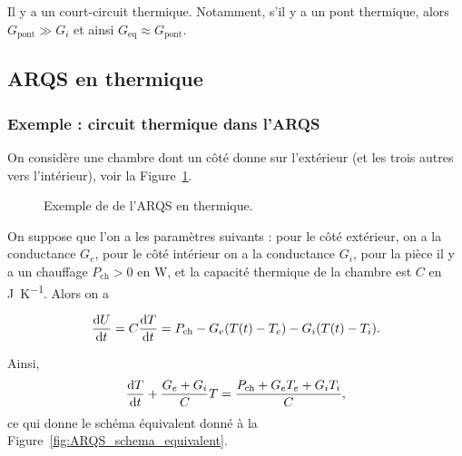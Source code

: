         Il y a un \og court-circuit thermique\fg. Notamment, s'il y a un pont thermique, alors $G_{\text{pont}}\gg G_i$ et ainsi $G_{\text{eq}}\approx G_{\text{pont}}$.

    \subsection{ARQS en thermique}

        \subsubsection{Exemple : circuit thermique dans l'ARQS}

            On considère une chambre dont un côté donne sur l'extérieur (et les trois autres vers l'intérieur), voir la Figure~\ref{fig:ARSQ_thermique_exemple}.
            \begin{figure}
                \centering
                \caption{Exemple de de l'ARQS en thermique.}    
                \label{fig:ARSQ_thermique_exemple}
            \end{figure}

            On suppose que l'on a les paramètres suivants : pour le côté extérieur, on a la conductance $G_e$, pour le côté intérieur on a la conductance $G_i$, pour la pièce il y a un chauffage $P_{\text{ch}}>0$ en \si{\watt}, et la capacité thermique de la chambre est $C$ en \si{\joule\per\kelvin}. Alors on a

            \begin{equation*}
                \frac{\mathrm{d} U}{\mathrm{d} t}=C\frac{\mathrm{d} T}{\mathrm{d} t}=P_{\text{ch}}-G_e(T(t)-T_e)-G_i(T(t)-T_i).
            \end{equation*}

            Ainsi,
            \begin{equation*}
                \frac{\mathrm{d} T}{\mathrm{d} t}+\frac{G_e+G_i}{C}T=\frac{P_{\text{ch}}+G_e T_e+G_i T_i}{C},
            \end{equation*}
            ce qui donne le schéma équivalent donné à la Figure~\ref{fig:ARQS_schema_equivalent}.

